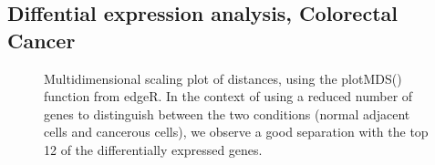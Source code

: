 \documentclass[a4paper,12pt]{report}
\begin{document}
\subsection{Diffential expression analysis, Colorectal Cancer}

\begin{figure}[H]
	\centering
	\hfill	
	
	\caption{Multidimensional scaling plot of distances, using the plotMDS() function from edgeR. In the context of using a reduced number of genes to distinguish between the two conditions (normal adjacent cells and cancerous cells), we observe a good separation with the top 12 of the differentially expressed genes.}
	
\end{figure}
\end{document}
